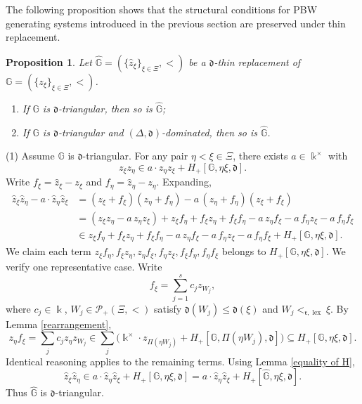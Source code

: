 \documentclass{article}
\makeatletter
\renewenvironment{proof}[1][\proofname]{\par
	\pushQED{\qed}%
	\normalfont \topsep6\p@\@plus6\p@\relax
	\trivlist
	\item[\hskip\labelsep
	\bfseries
	#1\@addpunct{.}]\ignorespaces
}{%
	\popQED\endtrivlist\@endpefalse
}
\theoremstyle{plain}
\newtheorem{prop}[thm]{Proposition}
\theoremstyle{definition}
\numberwithin{equation}{section}
\DeclareMathOperator{\lex}{lex}
\newcommand{\GG}{\mathbb{G}}
\newcommand{\dd}{\mathfrak{d}}
\newcommand{\rr}{\mathfrak{r}}
\makeatother
\begin{document}
	The following proposition shows that the structural conditions for PBW generating systems introduced in the previous section are preserved under thin replacement.
	
	\begin{prop}\label{proposition of replacement}
		Let $\hat{\GG}=(\{\hat{z}_{\xi}\}_{\xi\in \Xi}, <)$ be a $\dd$-thin replacement of  $\GG=(\{z_{\xi}\}_{\xi\in \Xi}, <)$.
		\begin{enumerate}
			\item If $\GG$ is $\dd$-triangular, then so is $\hat{\GG}$;
			\item If $\GG$ is $\dd$-triangular and $(\Delta,\dd)$-dominated, then so is $\hat{\GG}$.
		\end{enumerate}
	\end{prop}
	
	\begin{proof}
		(1) Assume $\GG$ is $\dd$-triangular. For any pair $\eta<\xi\in\Xi$, there exists $a\in \Bbbk^{\times}$ with
		\[
		z_\xi z_\eta \in a\cdot z_\eta z_\xi + H_{+}[\GG,\eta\xi,\dd].
		\]
		Write $f_{\xi} = \hat{z}_{\xi} -z_{\xi}$ and $f_{\eta} = \hat{z}_{\eta} -z_{\eta}$. Expanding,
		\[
		\begin{aligned}
			\hat{z}_\xi\hat{z}_\eta - a\cdot\hat{z}_\eta\hat{z}_\xi
			&= (z_\xi+f_\xi)(z_\eta+f_\eta) - a\,(z_\eta+f_\eta)(z_\xi+f_\xi) \\
			&= (z_\xi z_\eta - a\,z_\eta z_\xi)
			+ z_\xi f_\eta + f_\xi z_\eta + f_\xi f_\eta
			- a\,z_\eta f_\xi - a\,f_\eta z_\xi - a\,f_\eta f_\xi \\
			&\in z_\xi f_\eta + f_\xi z_\eta + f_\xi f_\eta
			- a\,z_\eta f_\xi - a\,f_\eta z_\xi - a\,f_\eta f_\xi + H_{+}[\GG,\eta\xi,\dd].
		\end{aligned}
		\]
		We claim each term $z_\xi f_\eta, f_\xi z_\eta, z_\eta f_\xi, f_\eta z_\xi, f_\xi f_\eta, f_\eta f_\xi$ belongs to $H_{+}[\GG,\eta\xi,\dd]$. We verify one representative case. Write
		$$f_\xi=\sum_{j=1}^{s} c_j z_{W_j},$$
		where $c_{j}\in \Bbbk$, $W_{j} \in \mathcal{P}_{+}(\Xi, <)$ satisfy $\dd(W_{j}) \leq \dd(\xi)$ and $W_{j} <_{\rr,\lex} \xi$. By Lemma \ref{rearrangement},
		\[
		z_\eta f_\xi = \sum_j c_j z_\eta z_{W_j}
		\in \sum_{j} \bigl(\Bbbk^\times\!\cdot\! z_{\Pi(\eta W_j)}
		+ H_{+}[\GG,\Pi(\eta W_j),\dd]\bigr)
		\subseteq H_{+}[\GG,\eta\xi,\dd].
		\]
		Identical reasoning applies to the remaining terms. Using Lemma \ref{equality of H},
		\[
		\hat{z}_\xi\hat{z}_\eta \in a\cdot\hat{z}_\eta\hat{z}_\xi
		+ H_{+}[\GG,\eta\xi,\dd]= a\cdot\hat{z}_\eta\hat{z}_\xi
		+ H_{+}[\hat{\GG},\eta\xi,\dd].
		\]
		Thus $\hat{\GG}$ is $\dd$-triangular.
		

\end{proof}
\end{document}
